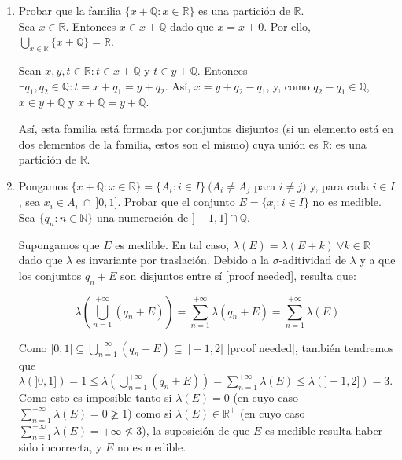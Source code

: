 
\begin{enumerate}[label=\alph*)]
	\item Probar que la familia $\{x + \mathbb Q : x \in \mathbb R \}$ es una partición de $\mathbb R$. \\
	
	Sea $x \in \mathbb R$. Entonces $x \in x+\mathbb Q$ dado que $x = x + 0$. Por ello, $\displaystyle \bigcup_{x \in \mathbb R} \{x+\mathbb Q\} = \mathbb R$.
	
	Sean $x,y,t \in \mathbb R : t \in x+\mathbb Q$ y $t \in y + \mathbb Q$. Entonces $\exists q_1, q_2 \in \mathbb Q : t = x + q_1 = y + q_2$. Así, $x = y + q_2 - q_1$, y, como $q_2 - q_1 \in \mathbb Q$, $x \in y + \mathbb Q$ y $x + \mathbb Q = y + \mathbb Q$.
	
	Así, esta familia está formada por conjuntos disjuntos (si un elemento está en dos elementos de la familia, estos son el mismo) cuya unión es $\mathbb R$: es una partición de $\mathbb R$.
	
	\item Pongamos $\{x+\mathbb Q : x \in \mathbb R\} = \{A_i : i \in I\} \ (A_i \ne A_j$ para $i \ne j)$ y, para cada $i \in I$, sea $x_i \in A_i \ \cap \ ]0, 1]$. Probar que el conjunto $E = \{x_i : i \in I\}$ no es medible. \\
	
	Sea $\{q_n : n \in \mathbb N\}$ una numeración de $]-1, 1] \cap \mathbb Q$.
	
	Supongamos que $E$ es medible. En tal caso, $\lambda(E) = \lambda(E+k) \ \forall k \in \mathbb R$ dado que $\lambda$ es invariante por traslación. Debido a la $\sigma$-aditividad de $\lambda$ y a que los conjuntos $q_n + E$ son disjuntos entre sí [proof needed], resulta que:
	
	$$\lambda(\bigcup_{n = 1}^{+\infty} (q_n + E)) = \sum_{n=1}^{+\infty}\lambda(q_n + E) = \sum_{n=1}^{+\infty} \lambda(E)$$
	
	Como $\displaystyle ]0, 1] \subseteq \bigcup_{n=1}^{+\infty} (q_n + E) \subseteq \ ]-1, 2]$ [proof needed], también tendremos que $\displaystyle \lambda(]0, 1]) = 1 \le \lambda(\bigcup_{n=1}^{+\infty} (q_n + E)) = \sum_{n=1}^{+\infty} \lambda(E) \le \lambda(]-1, 2]) = 3$. Como esto es imposible tanto si $\lambda(E) = 0$ (en cuyo caso $\displaystyle \sum_{n=1}^{+\infty} \lambda(E) = 0 \ngeq 1$) como si $\lambda(E) \in \mathbb R^+$ (en cuyo caso $\displaystyle \sum_{n=1}^{+\infty} \lambda(E) = +\infty \nleq 3$), la suposición de que $E$ es medible resulta haber sido incorrecta, y $E$ no es medible.
	

\end{enumerate}
